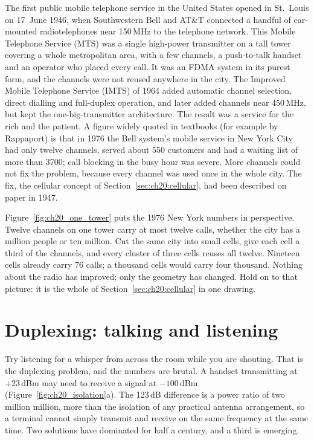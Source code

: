 \begin{history}
The first public mobile telephone service in the United States opened in St.~Louis on 17~June
1946, when Southwestern Bell and AT\&T connected a handful of car-mounted radiotelephones near
150\,MHz to the telephone network. This Mobile Telephone Service (MTS) was a single high-power
transmitter on a tall tower covering a whole metropolitan area, with a few channels, a
push-to-talk handset and an operator who placed every call. It was an FDMA system in its
purest form, and the channels were not reused anywhere in the city. The Improved Mobile
Telephone Service (IMTS) of 1964 added automatic channel selection, direct dialling and
full-duplex operation, and later added channels near 450\,MHz, but kept the
one-big-transmitter architecture. The result was a service for the rich and the patient. A
figure widely quoted in textbooks (for example by Rappaport) is that in 1976 the Bell system's
mobile service in New York City had only twelve channels, served about 550 customers and had a
waiting list of more than 3700; call blocking in the busy hour was severe. More channels could
not fix the problem, because every channel was used once in the whole city. The fix, the
cellular concept of Section~\ref{sec:ch20:cellular}, had been described on paper in 1947.
\end{history}

Figure~\ref{fig:ch20_one_tower} puts the 1976 New York numbers in perspective. Twelve channels on
one tower carry at most twelve calls, whether the city has a million people or ten million. Cut the
same city into small cells, give each cell a third of the channels, and every cluster of three cells
reuses all twelve. Nineteen cells already carry 76 calls; a thousand cells would carry four thousand.
Nothing about the radio has improved; only the geometry has changed. Hold on to that picture: it is
the whole of Section~\ref{sec:ch20:cellular} in one drawing.

\section{Duplexing: talking and listening}
\label{sec:ch20:duplex}

Try listening for a whisper from across the room while you are shouting. That is the duplexing
problem, and the numbers are brutal. A handset transmitting at $+23$\,dBm may need to receive a
signal at $-100$\,dBm (Figure~\ref{fig:ch20_isolation}a). The 123\,dB difference is a power ratio of
two million million, more than the isolation of any practical antenna arrangement, so a terminal
cannot simply transmit and receive on the same frequency at the same time. Two solutions have
dominated for half a century, and a third is emerging.


